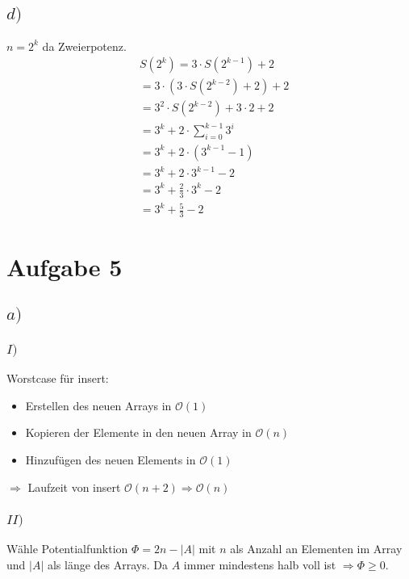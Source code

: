 \documentclass[a4paper]{scrartcl}
\begin{document}
\subsection*{$d)$}
$n = 2^k$ da Zweierpotenz.
\begin{align}
	&S(2^k) = 3 \cdot S(2^{k-1}) +2\\
	&= 3\cdot (3\cdot S(2^{k-2}) +2) +2\\
	&= 3^2 \cdot S(2^{k-2}) + 3 \cdot 2 +2\\
	&= 3^k + 2 \cdot \sum_{i = 0}^{k-1} 3^i\\
	&= 3^k + 2\cdot (3^{k-1} - 1)\\
	&= 3^k + 2 \cdot 3^{k-1} - 2\\
	&= 3^k + \frac{2}{3} \cdot3^k -2\\
	&= 3^k + \frac{5}{3} -2
\end{align}

\section*{Aufgabe 5}
\subsection*{$a)$}
\subsubsection*{$I)$}
Worstcase für insert:
\begin{itemize}
	\item Erstellen des neuen Arrays in $\mathcal{O}(1)$
	\item Kopieren der Elemente in den neuen Array in $\mathcal{O}(n)$
	\item Hinzufügen des neuen Elements in $\mathcal{O}(1)$
\end{itemize}
$\Rightarrow$ Laufzeit von insert $\mathcal{O}(n + 2) \Rightarrow \mathcal{O}(n)$
\subsubsection*{$II)$}
Wähle Potentialfunktion $\Phi = 2n - |A|$ mit $n$ als Anzahl an Elementen im Array und $|A|$ als länge des Arrays. Da $A$ immer mindestens halb voll ist $\Rightarrow \Phi \geq 0$.
\end{document}
